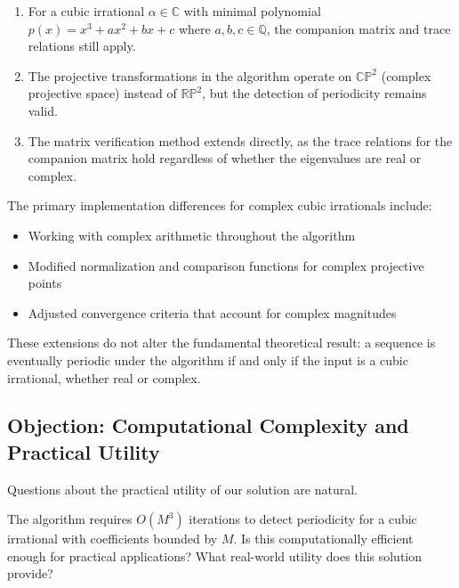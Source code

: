 \begin{enumerate}
    \item For a cubic irrational $\alpha \in \mathbb{C}$ with minimal polynomial $p(x) = x^3 + ax^2 + bx + c$ where $a,b,c \in \mathbb{Q}$, the companion matrix and trace relations still apply.
    
    \item The projective transformations in the \HAPD{} algorithm operate on $\mathbb{CP}^2$ (complex projective space) instead of $\mathbb{RP}^2$, but the detection of periodicity remains valid.
    
    \item The matrix verification method extends directly, as the trace relations for the companion matrix hold regardless of whether the eigenvalues are real or complex.
\end{enumerate}

The primary implementation differences for complex cubic irrationals include:

\begin{itemize}
    \item Working with complex arithmetic throughout the algorithm
    \item Modified normalization and comparison functions for complex projective points
    \item Adjusted convergence criteria that account for complex magnitudes
\end{itemize}

These extensions do not alter the fundamental theoretical result: a sequence is eventually periodic under the \HAPD{} algorithm if and only if the input is a cubic irrational, whether real or complex.

\subsection{Objection: Computational Complexity and Practical Utility}

Questions about the practical utility of our solution are natural.

\begin{objection}
The \HAPD{} algorithm requires $O(M^3)$ iterations to detect periodicity for a cubic irrational with coefficients bounded by $M$. Is this computationally efficient enough for practical applications? What real-world utility does this solution provide?
\end{objection}

